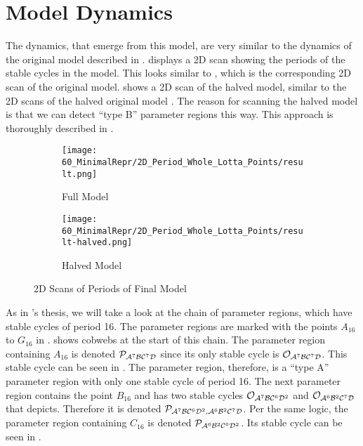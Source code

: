 \section{Model Dynamics}
\label{sec:minrep.dynamics}

The dynamics, that emerge from this model, are very similar to the dynamics of the original model described in .
 displays a 2D scan showing the periods of the stable cycles in the model.
This looks similar to , which is the corresponding 2D scan of the original model.
 shows a 2D scan of the halved model, similar to the 2D scans of the halved original model .
The reason for scanning the halved model is that we can detect ``type B'' parameter regions this way.
This approach is thoroughly described in .

\begin{figure}
    \centering
    \begin{subfigure}{0.4\textwidth}
        \centering
        \texttt{[image: 60\_MinimalRepr/2D\_Period\_Whole\_Lotta\_Points/result.png]}
        \caption{Full Model}
        \label{fig:final.period.whole.full}
    \end{subfigure}
    \begin{subfigure}{0.4\textwidth}
        \centering
        \texttt{[image: 60\_MinimalRepr/2D\_Period\_Whole\_Lotta\_Points/result-halved.png]}
        \caption{Halved Model}
        \label{fig:final.period.whole.halved}
    \end{subfigure}
    \caption{2D Scans of Periods of Final Model}
\end{figure}

As in 's thesis, we will take a look at the chain of parameter regions, which have stable cycles of period 16.
The parameter regions are marked with the points $A_{16}$ to $G_{16}$ in .
 shows cobwebs at the start of this chain.
The parameter region containing $A_{16}$ is denoted $\mathcal{P}_{\mathcal{A}^7\mathcal{B}\mathcal{C}^7\mathcal{D}}$ since its only stable cycle is $\mathcal{O}_{\mathcal{A}^7\mathcal{B}\mathcal{C}^7\mathcal{D}}$.
This stable cycle can be seen in .
The parameter region, therefore, is a ``type A'' parameter region with only one stable cycle of period 16.
The next parameter region contains the point $B_{16}$ and has two stable cycles $\mathcal{O}_{\mathcal{A}^7\mathcal{B}\mathcal{C}^6\mathcal{D}^2}$ and $\mathcal{O}_{\mathcal{A}^6\mathcal{B}^2\mathcal{C}^7\mathcal{D}}$ that  depicts.
Therefore it is denoted $\mathcal{P}_{\mathcal{A}^7\mathcal{B}\mathcal{C}^6\mathcal{D}^2, \mathcal{A}^6\mathcal{B}^2\mathcal{C}^7\mathcal{D}}$.
Per the same logic, the parameter region containing $C_{16}$ is denoted $\mathcal{P}_{\mathcal{A}^6\mathcal{B}^2\mathcal{C}^6\mathcal{D}^2}$.
Its stable cycle can be seen in .


